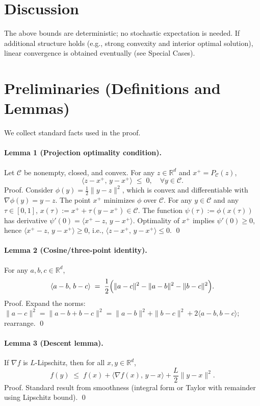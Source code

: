 \documentclass[11pt]{article}
\begin{document}
\section*{Discussion}
The above bounds are deterministic; no stochastic expectation is needed. If additional structure holds (e.g., strong convexity and interior optimal solution), linear convergence is obtained eventually (see Special Cases).

\section*{Preliminaries (Definitions and Lemmas)}
We collect standard facts used in the proof.

\paragraph{Lemma 1 (Projection optimality condition).}
Let $\mathcal{C}$ be nonempty, closed, and convex. For any $z\in\mathbb{R}^d$ and $x^+=P_{\mathcal{C}}(z)$,
\[
\langle z - x^+,\, y - x^+\rangle \;\le\; 0,\quad \forall y\in\mathcal{C}.
\]
Proof. Consider $\phi(y)=\frac12\|y-z\|^2$, which is convex and differentiable with $\nabla\phi(y)=y-z$. The point $x^+$ minimizes $\phi$ over $\mathcal{C}$. For any $y\in\mathcal{C}$ and any $\tau\in[0,1]$, $x(\tau):=x^++\tau(y-x^+)\in\mathcal{C}$. The function $\psi(\tau):=\phi(x(\tau))$ has derivative $\psi'(0)=\langle x^+-z,\, y-x^+\rangle$. Optimality of $x^+$ implies $\psi'(0)\ge 0$, hence $\langle x^+-z,\, y-x^+\rangle\ge 0$, i.e., $\langle z-x^+,\, y-x^+\rangle\le 0$. \qed

\paragraph{Lemma 2 (Cosine/three-point identity).}
For any $a,b,c\in\mathbb{R}^d$,
\[
\langle a-b,\, b-c\rangle \;=\; \frac12\Bigl(\|a-c\|^2 - \|a-b\|^2 - \|b-c\|^2\Bigr).
\]
Proof. Expand the norms: $\|a-c\|^2=\|a-b+b-c\|^2=\|a-b\|^2+\|b-c\|^2+2\langle a-b,b-c\rangle$; rearrange. \qed

\paragraph{Lemma 3 (Descent lemma).}
If $\nabla f$ is $L$-Lipschitz, then for all $x,y\in\mathbb{R}^d$,
\[
f(y)\;\le\; f(x) + \langle \nabla f(x),\, y-x\rangle + \frac{L}{2}\|y-x\|^2.
\]
Proof. Standard result from smoothness (integral form or Taylor with remainder using Lipschitz bound). \qed
\end{document}
